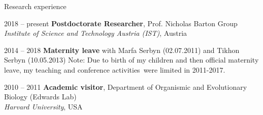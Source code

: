 \documentclass[10pt]{article}
\begin{document}
\begin{cv}
\begin{cvlist}{Research experience} %
\item[2018 -- present] \textbf{Postdoctorate Researcher}, Prof. Nicholas Barton Group \\
\textit{Institute of Science and Technology Austria (IST)}, Austria%
\item[2014 -- 2018] \textbf{Maternity leave} with Marfa Serbyn (02.07.2011) and Tikhon Serbyn (10.05.2013)
\small{Note: Due to birth of my children and then official maternity leave, my teaching and conference activities were limited
in 2011-2017.} 
 \item[2010 -- 2011] \textbf{Academic visitor},  Department of Organismic and Evolutionary Biology (Edwards Lab) \\ %
 \textit{Harvard University}, USA%

\end{cvlist}
\end{cv}
\end{document}

